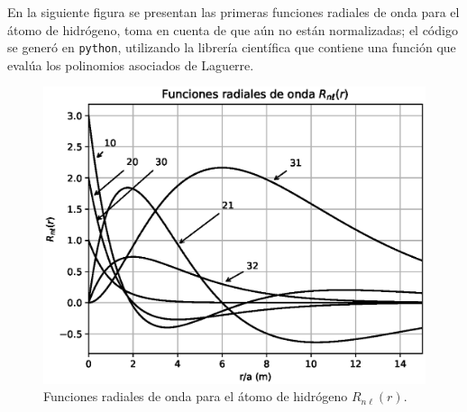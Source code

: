 \newpage
En la siguiente figura se presentan las primeras funciones radiales de onda para el átomo de hidrógeno, toma en cuenta de que aún no están normalizadas; el código se generó en \texttt{python}, utilizando la librería científica que contiene una función que evalúa los polinomios asociados de Laguerre.
\begin{figure}[H]
    \centering
    \includegraphics{Imagenes/plot_funcion_radial_higrogeno.eps}
    \caption{Funciones radiales de onda para el átomo de hidrógeno $R_{n \ell} (r)$.}
\end{figure}
